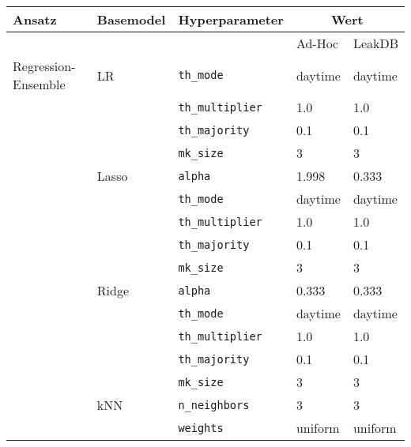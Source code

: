 \begin{table}[ht!]
    \footnotesize
    \begin{tabular}{lllll}
    Ansatz              & Basemodel & Hyperparameter                & \multicolumn{2}{c}{Wert} \\ \hline
                        &           &                               & Ad-Hoc      & LeakDB      \\ \cline{4-5}
    Regression-Ensemble & LR        & \texttt{th\_mode}             & daytime     & daytime     \\
                        &           & \texttt{th\_multiplier}       & 1.0         & 1.0         \\
                        &           & \texttt{th\_majority}         & 0.1         & 0.1         \\
                        &           & \texttt{mk\_size}             & 3           & 3           \\
                        & Lasso     & \texttt{alpha}                & 1.998       & 0.333       \\
                        &           & \texttt{th\_mode}             & daytime     & daytime     \\
                        &           & \texttt{th\_multiplier}       & 1.0         & 1.0         \\
                        &           & \texttt{th\_majority}         & 0.1         & 0.1         \\
                        &           & \texttt{mk\_size}             & 3           & 3           \\
                        & Ridge     & \texttt{alpha}                & 0.333       & 0.333       \\
                        &           & \texttt{th\_mode}             & daytime     & daytime     \\
                        &           & \texttt{th\_multiplier}       & 1.0         & 1.0         \\
                        &           & \texttt{th\_majority}         & 0.1         & 0.1         \\
                        &           & \texttt{mk\_size}             & 3           & 3           \\
                        & kNN       & \texttt{n\_neighbors}         & 3           & 3           \\
                        &           & \texttt{weights}              & uniform     & uniform     \\

\end{tabular}
\end{table}
